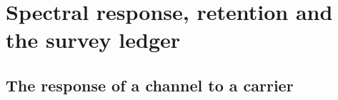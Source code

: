 \section{Spectral response, retention and the survey ledger}
\label{app:conventions}

\subsection{The response of a channel to a carrier}

